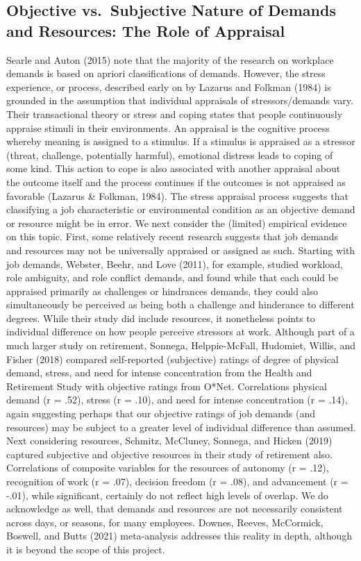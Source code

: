 \documentclass[
  english,
  man]{apa6}
\begin{document}
\hypertarget{objective-vs.-subjective-nature-of-demands-and-resources-the-role-of-appraisal}{%
\subsection{Objective vs.~Subjective Nature of Demands and Resources: The Role of Appraisal}\label{objective-vs.-subjective-nature-of-demands-and-resources-the-role-of-appraisal}}

Searle and Auton (2015) note that the majority of the research on workplace demands is based on apriori classifications of demands. However, the stress experience, or process, described early on by Lazarus and Folkman (1984) is grounded in the assumption that individual appraisals of stressors/demands vary. Their transactional theory or stress and coping states that people continuously appraise stimuli in their environments. An appraisal is the cognitive process whereby meaning is assigned to a stimulus. If a stimulus is appraised as a stressor (threat, challenge, potentially harmful), emotional distress leads to coping of some kind. This action to cope is also associated with another appraisal about the outcome itself and the process continues if the outcomes is not appraised as favorable (Lazarus \& Folkman, 1984). The stress appraisal process suggests that classifying a job characteristic or environmental condition as an objective demand or resource might be in error.
We next consider the (limited) empirical evidence on this topic. First, some relatively recent research suggests that job demands and resources may not be universally appraised or assigned as such. Starting with job demands, Webster, Beehr, and Love (2011), for example, studied workload, role ambiguity, and role conflict demands, and found while that each could be appraised primarily as challenges or hindrances demands, they could also simultaneously be perceived as being both a challenge and hinderance to different degrees. While their study did include resources, it nonetheless points to individual difference on how people perceive stressors at work. Although part of a much larger study on retirement, Sonnega, Helppie-McFall, Hudomiet, Willis, and Fisher (2018) compared self-reported (subjective) ratings of degree of physical demand, stress, and need for intense concentration from the Health and Retirement Study with objective ratings from O*Net. Correlations physical demand (r = .52), stress (r = .10), and need for intense concentration (r = .14), again suggesting perhaps that our objective ratings of job demands (and resources) may be subject to a greater level of individual difference than assumed. Next considering resources, Schmitz, McCluney, Sonnega, and Hicken (2019) captured subjective and objective resources in their study of retirement also. Correlations of composite variables for the resources of autonomy (r = .12), recognition of work (r = .07), decision freedom (r = .08), and advancement (r = -.01), while significant, certainly do not reflect high levels of overlap.
We do acknowledge as well, that demands and resources are not necessarily consistent across days, or seasons, for many employees. Downes, Reeves, McCormick, Boswell, and Butts (2021) meta-analysis addresses this reality in depth, although it is beyond the scope of this project.
\end{document}
